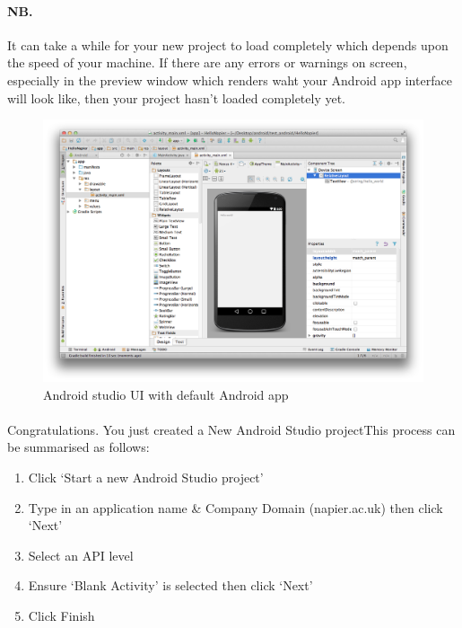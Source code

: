 \paragraph{NB.} It can take a while for your new project to load completely which depends upon the speed of your machine. If there are any errors or warnings on screen, especially in the preview window which renders waht your Android app interface will look like, then your project hasn't loaded completely yet.

\begin{figure}[H]
\centering
\includegraphics[width=\textwidth]{images/android-studio_08_studio-ui}
\caption{Android studio UI with default Android app}
\label{fig:android.studio_studioui}
\end{figure}

\paragraph{} Congratulations. You just created a New Android Studio projectThis process can be summarised as follows:

\begin{enumerate}
\item Click `Start a new Android Studio project'
\item Type in an application name \& Company Domain (napier.ac.uk) then click `Next'
\item Select an API level
\item Ensure `Blank Activity' is selected then click `Next'
\item Click Finish
\end{enumerate}

